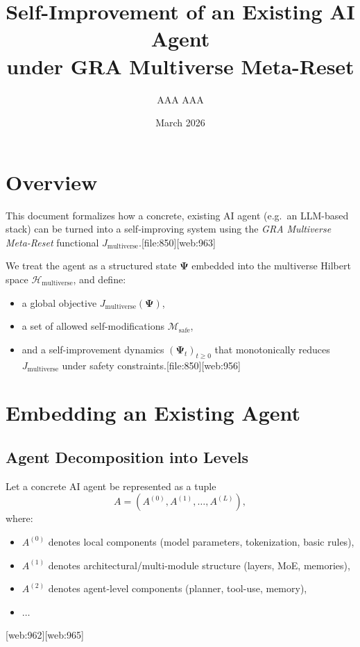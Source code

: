 \documentclass[12pt]{article}
\title{Self-Improvement of an Existing AI Agent\\
under GRA Multiverse Meta-Reset}
\author{AAA AAA}
\date{March 2026}
\begin{document}
\maketitle

\section{Overview}

This document formalizes how a concrete, existing AI agent (e.g.\ an LLM-based
stack) can be turned into a self-improving system using the
\emph{GRA Multiverse Meta-Reset} functional $J_{\text{multiverse}}$.[file:850][web:963]

We treat the agent as a structured state $\bm{\Psi}$ embedded into the
multiverse Hilbert space $\mathcal{H}_{\text{multiverse}}$, and define:
\begin{itemize}
  \item a global objective $J_{\text{multiverse}}(\bm{\Psi})$,
  \item a set of allowed self-modifications $\mathcal{M}_{\text{safe}}$,
  \item and a self-improvement dynamics $(\bm{\Psi}_t)_{t \ge 0}$ that
        monotonically reduces $J_{\text{multiverse}}$ under safety constraints.[file:850][web:956]
\end{itemize}

\section{Embedding an Existing Agent}

\subsection{Agent Decomposition into Levels}

Let a concrete AI agent be represented as a tuple
\[
A = (A^{(0)}, A^{(1)}, \dots, A^{(L)}),
\]
where:
\begin{itemize}
  \item $A^{(0)}$ denotes local components (model parameters, tokenization, basic rules),
  \item $A^{(1)}$ denotes architectural/multi-module structure (layers, MoE, memories),
  \item $A^{(2)}$ denotes agent-level components (planner, tool-use, memory),
  \item $\dots$
\end{itemize}[web:962][web:965]
\end{document}
